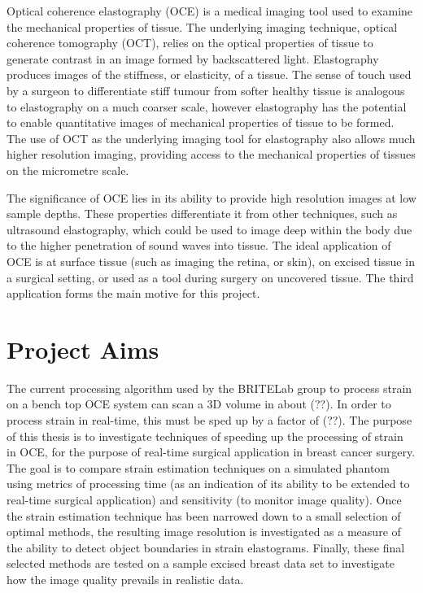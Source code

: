 Optical coherence elastography (OCE) is a medical imaging tool used to examine the mechanical properties of tissue. The underlying imaging technique, optical coherence tomography (OCT), relies on the optical properties of tissue to generate contrast in an image formed by backscattered light. Elastography produces images of the stiffness, or elasticity, of a tissue. The sense of touch used by a surgeon to differentiate stiff tumour from softer healthy tissue is analogous to elastography on a much coarser scale, however elastography has the potential to enable quantitative images of mechanical properties of tissue to be formed. The use of OCT as the underlying imaging tool for elastography also allows much higher resolution imaging, providing access to the mechanical properties of tissues on the micrometre scale. 

The significance of OCE lies in its ability to provide high resolution images at low sample depths. These properties differentiate it from other techniques, such as ultrasound elastography, which could be used to image deep within the body due to the higher penetration of sound waves into tissue. The ideal application of OCE is at surface tissue (such as imaging the retina, or skin), on excised tissue in a surgical setting, or used as a tool during surgery on uncovered tissue. The third application forms the main motive for this project.

\section{Project Aims}

The current processing algorithm used by the BRITELab group to process strain on a bench top OCE system can scan a 3D volume in about (??). In order to process strain in real-time, this must be sped up by a factor of (??). The purpose of this thesis is to investigate techniques of speeding up the processing of strain in OCE, for the purpose of real-time surgical application in breast cancer surgery. The goal is to compare strain estimation techniques on a simulated phantom using metrics of processing time (as an indication of its ability to be extended to real-time surgical application) and sensitivity (to monitor image quality). Once the strain estimation technique has been narrowed down to a small selection of optimal methods, the resulting image resolution is investigated as a measure of the ability to detect object boundaries in strain elastograms. Finally, these final selected methods are tested on a sample excised breast data set to investigate how the image quality prevails in realistic data.
